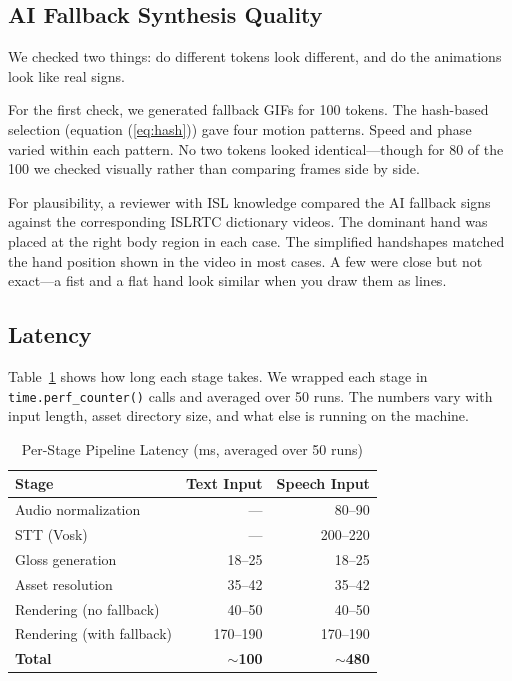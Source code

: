 \documentclass[conference]{IEEEtran}
\begin{document}
\subsection{AI Fallback Synthesis Quality}

We checked two things: do different tokens look different, and do the animations look like real signs.

For the first check, we generated fallback GIFs for 100 tokens. The hash-based selection (equation (\ref{eq:hash})) gave four motion patterns. Speed and phase varied within each pattern. No two tokens looked identical---though for 80 of the 100 we checked visually rather than comparing frames side by side.

For plausibility, a reviewer with ISL knowledge compared the AI fallback signs against the corresponding ISLRTC dictionary videos. The dominant hand was placed at the right body region in each case. The simplified handshapes matched the hand position shown in the video in most cases. A few were close but not exact---a fist and a flat hand look similar when you draw them as lines.

\subsection{Latency}

Table~\ref{tab:latency} shows how long each stage takes. We wrapped each stage in \texttt{time.perf\_counter()} calls and averaged over 50 runs. The numbers vary with input length, asset directory size, and what else is running on the machine.

\begin{table}[t]
\centering
\caption{Per-Stage Pipeline Latency (ms, averaged over 50 runs)}
\label{tab:latency}
\begin{tabular}{@{}lrr@{}}
\toprule
\textbf{Stage} & \textbf{Text Input} & \textbf{Speech Input} \\
\midrule
Audio normalization & --- & 80--90 \\
STT (Vosk) & --- & 200--220 \\
Gloss generation & 18--25 & 18--25 \\
Asset resolution & 35--42 & 35--42 \\
Rendering (no fallback) & 40--50 & 40--50 \\
Rendering (with fallback) & 170--190 & 170--190 \\
\midrule
\textbf{Total} & \textbf{$\sim$100} & \textbf{$\sim$480} \\
\bottomrule
\end{tabular}
\end{table}
\end{document}
